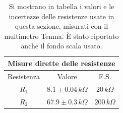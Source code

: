 \documentclass[a4paper,11pt]{article}
\begin{document}
\renewcommand{\arraystretch}{1.1}
\begin{table}
\centering
\setlength{\tabcolsep}{10pt}
\begin{tabular}{ |c|c|c|  }
\hline
\multicolumn{3}{|c|}{Misure dirette delle resistenze} \\
\hline
Resistenza      & Valore & F.S.\\
\hline
$R_{1}$ & $8.1 \pm 0.04\,\si{k\Omega}$ &$20\,\si{k\Omega}$ \\
$R_{2}$ & $67.9 \pm 0.3\,\si{k\Omega}$ &$200\,\si{k\Omega}$ \\
\hline
\end{tabular}
\caption{\footnotesize Si mostrano in tabella i valori e le incertezze delle resistenze usate in questa sezione, misurati con il multimetro Tenma. È stato riportato anche il fondo scala usato.}
\label{tab:resist}
\end{table}
\end{document}
